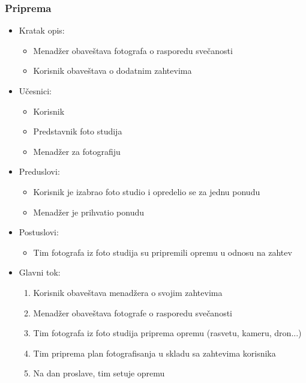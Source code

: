 \documentclass[a4paper]{article}
\begin{document}
\subsubsection{Priprema}
\begin{itemize}
    \item Kratak opis: 
    \begin{itemize}
        \item Menadžer obaveštava fotografa o rasporedu svečanosti
        \item Korisnik obaveštava o dodatnim zahtevima
    \end{itemize}
    \item Učesnici:
        \begin{itemize}
        \item Korisnik
        \item Predstavnik foto studija
        \item Menadžer za fotografiju
    \end{itemize}
    \item Preduslovi:
        \begin{itemize}
            \item Korisnik je izabrao foto studio i opredelio se za jednu ponudu
            \item Menadžer je prihvatio ponudu
        \end{itemize}
    \item Postuslovi:
        \begin{itemize}
            \item Tim fotografa iz foto studija su pripremili opremu u odnosu na zahtev
        \end{itemize}
    \item Glavni tok:
        \begin{enumerate}
            \item Korisnik obaveštava menadžera o svojim zahtevima 
            \item Menadžer obaveštava fotografe o rasporedu svečanosti
            \item Tim fotografa iz foto studija priprema opremu (rasvetu, kameru, dron...)
            \item Tim priprema plan fotografisanja u skladu sa zahtevima korisnika
            \item Na dan proslave, tim setuje opremu
        \end{enumerate}
\end{itemize}
\end{document}
